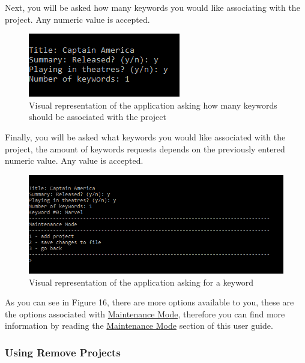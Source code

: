 \documentclass[
  english,
  a4paper,
,tablecaptionabove
]{scrartcl}
\begin{document}
Next, you will be asked how many keywords you would like associating
with the project. Any numeric value is accepted.

\begin{figure}
\centering
\includegraphics{images/user-guide/maintenance-mode/add-project-keywords-amount.png}
\caption{Visual representation of the application asking how many
keywords should be associated with the project}
\end{figure}

Finally, you will be asked what keywords you would like associated with
the project, the amount of keywords requests depends on the previously
entered numeric value. Any value is accepted.

\begin{figure}
\centering
\includegraphics{images/user-guide/maintenance-mode/add-project-keywords.png}
\caption{Visual representation of the application asking for a keyword}
\end{figure}

As you can see in Figure 16, there are more options available to you,
these are the options associated with
\protect\hyperlink{using-maintenance-mode}{Maintenance Mode}, therefore
you can find more information by reading the
\protect\hyperlink{using-maintenance-mode}{Maintenance Mode} section of
this user guide.

\newpage

\hypertarget{using-remove-projects}{%
\subsubsection{Using Remove Projects}\label{using-remove-projects}}
\end{document}
